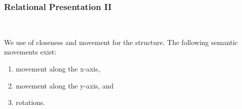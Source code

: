 
\begin{frame}
  \frametitle{Relational Presentation II}
  \begin{module}[id=relationalPresentation2]\\
\noindent

We use of closeness and movement for the structure. The following semantic movements exist:\\
\vspace{-12pt}
\begin{enumerate}
\item movement along the x-axis,
\vspace{-4mm}
\item movement along the y-axis, and
\vspace{-4mm}
\item rotations.
\end{enumerate}
\vspace{5pt}

  \end{module}
\end{frame}
